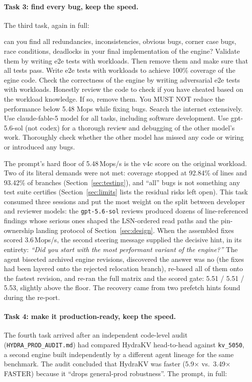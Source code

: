 \documentclass{article}
\newenvironment{promptbox}{\begin{mdframed}[linewidth=0.4pt,linecolor=black,innerleftmargin=5pt,innerrightmargin=5pt,innertopmargin=5pt,innerbottommargin=5pt,skipabove=2pt,skipbelow=5pt]\setlength{\parskip}{0pt}\setlength{\parindent}{0pt}\ttfamily\scriptsize\raggedright\frenchspacing\obeylines\leavevmode\strut\ignorespaces}{\end{mdframed}}
\newcommand{\HydraFinalRuns}{5.51 / 5.51 / 5.53}  %
\newcommand{\CovLines}{92.84\%}
\newcommand{\CovBranches}{93.42\%}
\begin{document}
\paragraph{Task 3: find every bug, keep the speed.}
The third task, again in full:

\begin{promptbox}
can you find all redundancies, inconsistencies, obvious bugs, corner case bugs, race conditions, deadlocks in your final implementation of the engine?  Validate them by writing e2e tests with workloads.  Then remove them and make sure that all tests pass.  Write e2e tests with workloads to achieve 100\% coverage of the egine code.  Check the correctness of the engine by writing adversarial e2e tests with workloads.  Honestly review the code to check if you have cheated based on the workload knowledge. If so, remove them.  You MUST NOT reduce the performance below 5.48 Mops while fixing bugs.  Search the internet extensively.  Use claude-fable-5 model for all tasks, including software development. Use gpt-5.6-sol (not codex) for a thorough review and debugging of the other model's work. Thoroughly check whether the other model has missed any code or wiring or introduced any bugs.
\end{promptbox}

The prompt's hard floor of 5.48\,Mops/s is the v4c score on the original workload. Two of its literal demands were not met: coverage stopped at \CovLines{} of lines and \CovBranches{} of branches (Section~\ref{sec:testing}), and ``all'' bugs is not something any test suite certifies (Section~\ref{sec:limits} lists the residual risks left open). This task consumed three sessions and put the most weight on the split between developer and reviewer models: the \texttt{gpt-5.6-sol} reviews produced dozens of line-referenced findings whose serious ones shaped the LSN-ordered read paths and the pin-ownership landing protocol of Section~\ref{sec:design}. When the assembled fixes scored 3.6\,Mops/s, the second steering message supplied the decisive hint, in its entirety: \emph{``Did you start with the most performant variant of the engine?''} The agent bisected archived engine revisions, discovered the answer was no (the fixes had been layered onto the rejected relocation branch), re-based all of them onto the fastest revision, and re-ran the full matrix and the scored gate: \HydraFinalRuns, slightly above the floor. The recovery came from two prefetch hints found during the re-port.

\paragraph{Task 4: make it production-ready, keep the speed.}
The fourth task arrived after an independent code-level audit (\texttt{HYDRA\_PROD\_AUDIT.md}) had compared HydraKV head-to-head against \texttt{kv\_5050}, a second engine built independently by a different agent lineage for the same benchmark. The audit concluded that HydraKV was faster (5.9$\times$ vs.\ 3.49$\times$ FASTER) because it ``drops general-prod robustness''. The prompt, in full:
\end{document}
